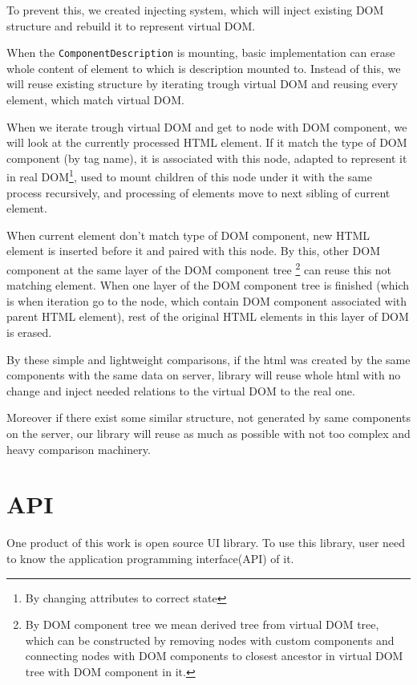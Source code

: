 \documentclass[oneside, 12pt]{book}
\begin{document}
    To prevent this, we created injecting system, which will inject existing DOM structure and rebuild it to represent virtual DOM.

    When the \texttt{ComponentDescription} is mounting, basic implementation can erase whole content of element to which is description mounted to.
    Instead of this, we will reuse existing structure by iterating trough virtual DOM and reusing every element, which match virtual DOM. 

    When we iterate trough virtual DOM and get to node with DOM component, we will look at the currently processed HTML element.
    If it match the type of DOM component (by tag name), 
    it is associated with this node, 
    adapted to represent it in real DOM\footnote{By changing attributes to correct state}, 
    used to mount children of this node under it with the same process recursively,
    and processing of elements move to next sibling of current element.

    When current element don't match type of DOM component, 
    new HTML element is inserted before it and paired with this node. 
    By this, other DOM component at the same layer of the DOM component tree
    \footnote{
      By DOM component tree we mean derived tree from virtual DOM tree, 
      which can be constructed by removing nodes with custom components
      and connecting nodes with DOM components to closest ancestor in virtual DOM tree with DOM component in it.
    }
    can reuse this not matching element.
    When one layer of the DOM component tree is finished
    (which is when iteration go to the node, which contain DOM component associated with parent HTML element),
    rest of the original HTML elements in this layer of DOM is erased. 

    By these simple and lightweight comparisons, if the html was created by the same components with the same data on server, 
    library will reuse whole html with no change and inject needed relations to the virtual DOM to the real one. 

    Moreover if there exist some similar structure, not generated by same components on the server, 
    our library will reuse as much as possible with not too complex and heavy comparison machinery.

\section{API}\label{sec:our-api}

  One product of this work is open source UI library.
  To use this library, user need to know the application programming interface(API) of it. 
\end{document}
